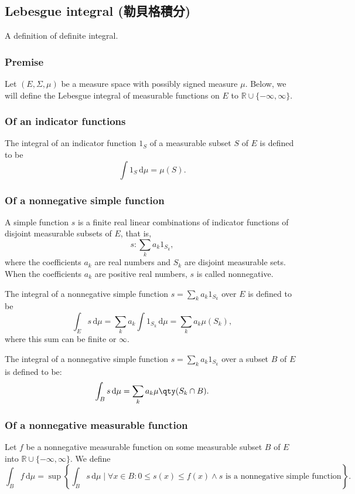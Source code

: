 \documentclass[a4paper,12pt]{report}
\begin{document}
\begin{itemize}
\begin{itemize}
\subsection{Lebesgue integral (勒貝格積分)}
A definition of definite integral.
\subsubsection{Premise}
Let $(E,\Sigma,\mu)$ be a measure space with possibly signed measure $\mu$. Below, we will define the Lebesgue integral of measurable functions on $E$ to $\mathbb{R}\cup\{-\infty,\infty\}$.
\subsubsection{Of an indicator functions}
The integral of an indicator function $1_S$ of a measurable subset $S$ of $E$ is defined to be
\[\int 1_{S}\,\mathrm{d}{\mu} =\mu (S).\]
\subsubsection{Of a nonnegative simple function}
A simple function $s$ is a finite real linear combinations of indicator functions of disjoint measurable subsets of $E$, that is,
\[s\colon\sum_ka_k1_{S_k},\]
where the coefficients $a_k$ are real numbers and $S_k$ are disjoint measurable sets. When the coefficients $a_k$ are positive real numbers, $s$ is called nonnegative.

The integral of a nonnegative simple function $s=\sum_ka_k1_{S_k}$ over $E$ is defined to be
\[\int_Es\,\mathrm{d}\mu=\sum_ka_k\int 1_{S_k}\,\mathrm{d}\mu=\sum_ka_k\mu(S_k),\]
where this sum can be finite or $\infty$.

The integral of a nonnegative simple function $s=\sum_ka_k1_{S_k}$ over a subset $B$ of $E$ is defined to be:
\[\int_Bs\,\mathrm{d}\mu=\sum_ka_k\mu \qty(S_k\cap B).\]
\subsubsection{Of a nonnegative measurable function}
Let $f$ be a nonnegative measurable function on some measurable subset $B$ of $E$ into $\mathbb{R}\cup\{-\infty,\infty\}$. We define
\[\int_Bf\,\mathrm{d}\mu=\sup\left\{\int_Bs\,\mathrm{d}\mu\mid\forall x\in B\colon 0\leq s(x)\leq f(x)\land s\text{\ is a nonnegative simple function}\right\}.\]

\end{itemize}
\end{itemize}
\end{document}
